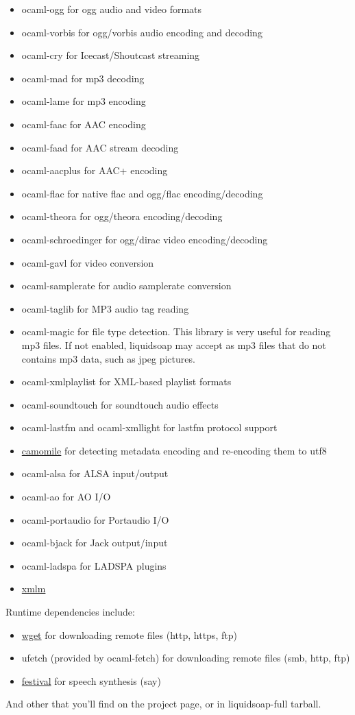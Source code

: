 \begin{itemize}
\item ocaml-ogg for ogg audio and video formats
\item ocaml-vorbis for ogg/vorbis audio encoding and decoding
\item ocaml-cry for Icecast/Shoutcast streaming
\item ocaml-mad for mp3 decoding
\item ocaml-lame for mp3 encoding
\item ocaml-faac for AAC encoding
\item ocaml-faad for AAC stream decoding
\item ocaml-aacplus for AAC+ encoding
\item ocaml-flac for native flac and ogg/flac encoding/decoding
\item ocaml-theora for ogg/theora encoding/decoding
\item ocaml-schroedinger for ogg/dirac video encoding/decoding
\item ocaml-gavl for video conversion
\item ocaml-samplerate for audio samplerate conversion
\item ocaml-taglib for MP3 audio tag reading
\item ocaml-magic for file type detection. This library is very useful for reading mp3 files. If not enabled, liquidsoap may accept as mp3 files that do not contains mp3 data, such as jpeg pictures.
\item ocaml-xmlplaylist for XML-based playlist formats
\item ocaml-soundtouch for soundtouch audio effects
\item ocaml-lastfm and ocaml-xmllight for lastfm protocol support
\item \href{http://camomile.sourceforge.net/}{camomile} for detecting metadata encoding and re-encoding them to utf8
\item ocaml-alsa for ALSA input/output
\item ocaml-ao for AO I/O
\item ocaml-portaudio for Portaudio I/O
\item ocaml-bjack for Jack output/input
\item ocaml-ladspa for LADSPA plugins
\item \href{http://erratique.ch/software/xmlm}{xmlm}

\end{itemize}
Runtime dependencies include:

\begin{itemize}
\item \href{http://www.gnu.org/software/wget/}{wget} for downloading remote files (http, https, ftp)
\item ufetch (provided by ocaml-fetch) for downloading remote files (smb, http, ftp)
\item \href{http://www.cstr.ed.ac.uk/projects/festival/}{festival} for speech synthesis (say)

\end{itemize}
And other that you'll find on the project page, or in liquidsoap-full tarball.

